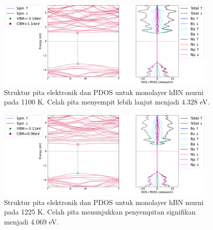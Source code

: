 \begin{figure}[htbp!] %
    \centering
    \includegraphics[width=0.95\textwidth]{gambar_hasil/simple_bands_pdos_pure_1100K.png}
    \caption{Struktur pita elektronik dan PDOS untuk monolayer hBN murni pada 1100 K. Celah pita menyempit lebih lanjut menjadi $4.328$ eV.}
    \label{fig:hbn_pure_1100K}
\end{figure}

\begin{figure}[htbp!] %
    \centering
    \includegraphics[width=0.95\textwidth]{gambar_hasil/simple_bands_pdos_pure_1225K.png}
    \caption{Struktur pita elektronik dan PDOS untuk monolayer hBN murni pada 1225 K. Celah pita menunjukkan penyempitan signifikan menjadi $4.069$ eV.}
    \label{fig:hbn_pure_1225K}
\end{figure}

